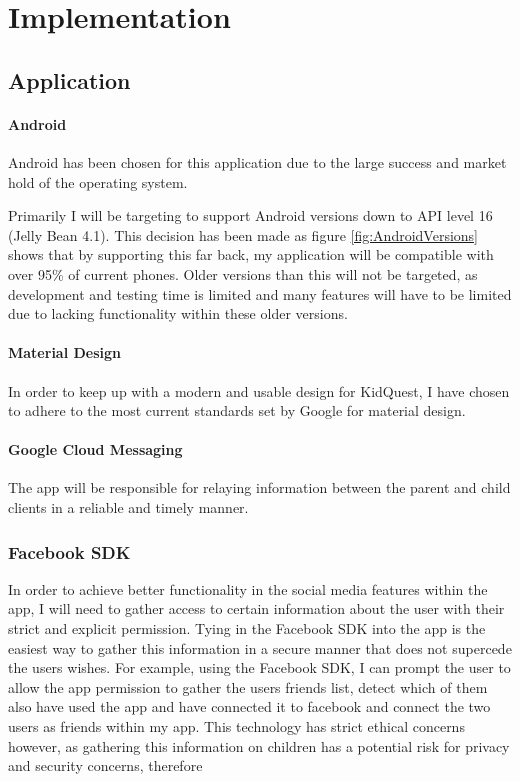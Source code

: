 

\chapter{Implementation}

\section{Application}
\subsubsection{Android}
Android has been chosen for this application due to the large success and market hold of the operating system.

Primarily I will be targeting to support Android versions down to API level 16 (Jelly Bean 4.1).
This decision has been made as figure \ref{fig:AndroidVersions} shows that by supporting this far back, my application will be compatible with over 95\% of current phones. 
Older versions than this will not be targeted, as development and testing time is limited and many features will have to be limited due to lacking functionality within these older versions.

\subsubsection{Material Design}
In order to keep up with a modern and usable design for KidQuest, I have chosen to adhere to the most current standards set by Google for material design.

\subsubsection{Google Cloud Messaging}
The app will be responsible for relaying information between the parent and child clients in a reliable and timely manner.


\subsection{Facebook SDK}
In order to achieve better functionality in the social media features within the app, I will need to gather access to certain information about the user with their strict and explicit permission. 
Tying in the Facebook SDK into the app is the easiest way to gather this information in a secure manner that does not supercede the users wishes.
For example, using the Facebook SDK, I can prompt the user to allow the app permission to gather the users friends list, detect which of them also have used the app and have connected it to facebook and connect the two users as friends within my app.
This technology has strict ethical concerns however, as gathering this information on children has a potential risk for privacy and security concerns, therefore

